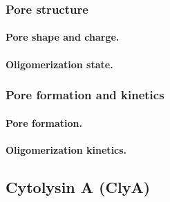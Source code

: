 \subsubsection{Pore structure}

\paragraph{Pore shape and charge.}

\paragraph{Oligomerization state.}

\subsubsection{Pore formation and kinetics}

\paragraph{Pore formation.}

\paragraph{Oligomerization kinetics.}


\subsection{Cytolysin A (ClyA)}

